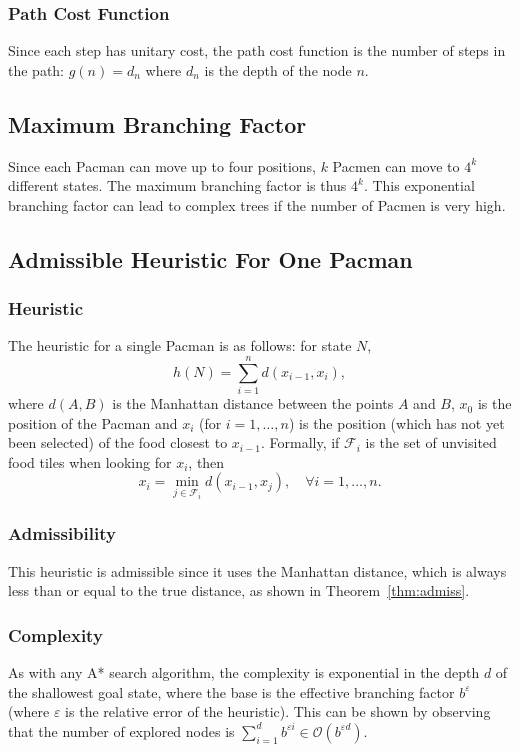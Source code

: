 \documentclass[journal]{IEEEtran}
\begin{document}
\subsubsection{Path Cost Function}
Since each step has unitary cost, the path cost function is the number of steps in the path: $g(n) = d_n$ where $d_n$ is the depth of the node $n$.


\subsection{Maximum Branching Factor}
Since each Pacman can move up to four positions, $k$ Pacmen can move to $4^k$ different states.
The maximum branching factor is thus $4^k$.
This exponential branching factor can lead to complex trees if the number of Pacmen is very high.


\subsection{Admissible Heuristic For One Pacman}
\subsubsection{Heuristic}
The heuristic for a single Pacman is as follows: for state $N$,
\[
 h(N) = \sum_{i=1}^n d(x_{i-1},x_i),
\]
where $d(A,B)$ is the Manhattan distance between the points $A$ and $B$, $x_0$ is the position of the Pacman and $x_i$ (for \(i = 1, \ldots, n\)) is the position (which has not yet been selected) of the food closest to $x_{i-1}$.
Formally, if \(\mathscr{F}_i\) is the set of  unvisited food tiles when looking for \(x_i\), then
\[
x_{i} = \min_{j \in \mathscr{F}_i} d(x_{i-1}, x_j), \quad \forall i = 1, \ldots, n.
\]

\subsubsection{Admissibility}
This heuristic is admissible since it uses the Manhattan distance, which is always less than or equal to the true distance, as shown in Theorem~\ref{thm:admiss}.

\subsubsection{Complexity}
As with any A* search algorithm, the complexity is exponential in the depth \(d\) of the shallowest goal state, where the base is the effective branching factor \(b^\varepsilon\) (where \(\varepsilon\) is the relative error of the heuristic).
This can be shown by observing that the number of explored nodes is \(\sum_{i=1}^d b^{\varepsilon i} \in \mathcal{O}(b^{\varepsilon d})\).
\end{document}
